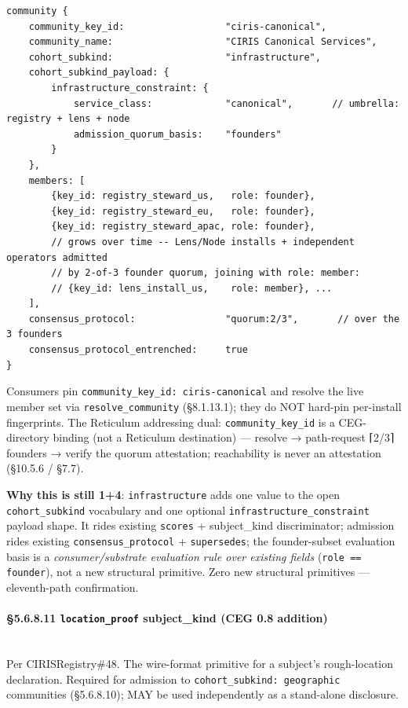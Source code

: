 \documentclass[11pt]{article}
\begin{document}
\begin{lstlisting}
community {
    community_key_id:                  "ciris-canonical",
    community_name:                    "CIRIS Canonical Services",
    cohort_subkind:                    "infrastructure",
    cohort_subkind_payload: {
        infrastructure_constraint: {
            service_class:             "canonical",       // umbrella: registry + lens + node
            admission_quorum_basis:    "founders"
        }
    },
    members: [
        {key_id: registry_steward_us,   role: founder},
        {key_id: registry_steward_eu,   role: founder},
        {key_id: registry_steward_apac, role: founder},
        // grows over time -- Lens/Node installs + independent operators admitted
        // by 2-of-3 founder quorum, joining with role: member:
        // {key_id: lens_install_us,    role: member}, ...
    ],
    consensus_protocol:                "quorum:2/3",       // over the 3 founders
    consensus_protocol_entrenched:     true
}
\end{lstlisting}

Consumers pin \texttt{community\_key\_id: ciris-canonical} and resolve the live member set via \texttt{resolve\_community} (§8.1.13.1); they do NOT hard-pin per-install fingerprints. The Reticulum addressing dual: \texttt{community\_key\_id} is a CEG-directory binding (not a Reticulum destination) — resolve → path-request ⌈2/3⌉ founders → verify the quorum attestation; reachability is never an attestation (§10.5.6 / §7.7).


\textbf{Why this is still 1+4}: \texttt{infrastructure} adds one value to the open \texttt{cohort\_subkind} vocabulary and one optional \texttt{infrastructure\_constraint} payload shape. It rides existing \texttt{scores} + subject\_kind discriminator; admission rides existing \texttt{consensus\_protocol} + \texttt{supersedes}; the founder-subset evaluation basis is a \textit{consumer/substrate evaluation rule over existing fields} (\texttt{role == founder}), not a new structural primitive. Zero new structural primitives — eleventh-path confirmation.


\paragraph{§5.6.8.11 \texttt{location\_proof} subject\_kind (CEG 0.8 addition)}\mbox{}\\


Per CIRISRegistry\#48. The wire-format primitive for a subject's rough-location declaration. Required for admission to \texttt{cohort\_subkind: geographic} communities (§5.6.8.10); MAY be used independently as a stand-alone disclosure.
\end{document}
